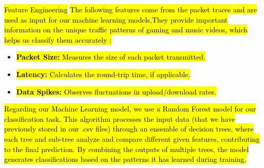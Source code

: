 \hl{Feature Engineering}
\hl{The following features come from the packet traces and are used as input for our machine learning models,They provide important information on the unique traffic patterns of gaming and music videos, which helps us classify them accurately :}
\begin{itemize}
    \item \hl{\textbf{Packet Size:} Measures the size of each packet transmitted.}
    \item \hl{\textbf{Latency:} Calculates the round-trip time, if applicable.}
    \item \hl{\textbf{Data Spikes:} Observes fluctuations in upload/download rates.}
\end{itemize}



\hl{Regarding our Machine Learning model, we use a Random Forest model for our classification task. This algorithm processes the input data (that we have previously stored in our .csv files) through an ensemble of decision trees, where each tree and sub-tree analyze and compare different given features, contributing to the final prediction. By combining the outputs of multiple trees, the model generates classifications based on the patterns it has learned during training.
}
\vspace{2mm}

